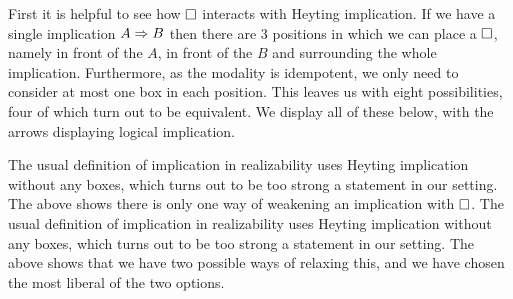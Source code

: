 \documentclass[11pt]{article}
\begin{document}
First it is helpful to see how \(\Box\) interacts with Heyting implication.
%
If we have a single implication \({A}\Rightarrow{B}\) then there are 3 positions
in which we can place a \(\Box\), namely in front of the \(A\), in front
of the \(B\) and surrounding the whole implication.
%
Furthermore, as the modality is idempotent, we only need to consider at most
one box in each position.
%
This leaves us with eight possibilities, four of which turn out to be
equivalent.
%
We display all of these below, with the arrows displaying logical implication.
%
\begin{center}
\end{center}
%
%
%
%
%
%
%
The usual definition of implication in realizability uses Heyting implication
without any boxes, which turns out to be too strong a statement in our setting.
%
The above shows there is only one way of weakening an implication with
\(\Box\).
%
The usual definition of implication in realizability uses Heyting implication
without any boxes, which turns out to be too strong a statement in our setting.
%
The above shows that we have two possible ways of relaxing this, and
we have chosen the most liberal of the two options.
\end{document}
